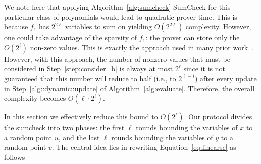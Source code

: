 					

We note here that applying Algorithm~\ref{alg:sumcheck} \textsf{SumCheck} for this particular class of polynomials would lead to quadratic prover time. This is because $f_1$ has $2^{2\ell}$ variables to sum on yielding $O(2^{2\ell})$ complexity. However, one could take advantage of the sparsity of $f_1$: the prover can store only the $O(2^\ell)$ non-zero values. This is exactly the approach used in many prior work~\cite{CMT,wahby2017full,vram}. However, with this approach, the number of nonzero values that must be considered in Step~\ref{step:consider_b} is always at most $2^{\ell}$ since it is not guaranteed that this number will reduce to half (i.e., to $2^{\ell-i}$) after every update in Step~\ref{alg::dynamic::update} of Algorithm~\ref{alg:evaluate}. Therefore, the overall complexity becomes $O(\ell \cdot 2^\ell)$. 

In this section we effectively reduce this bound to $O(2^\ell)$. Our protocol divides the sumcheck into two phases: the first $\ell$ rounds bounding the variables of $x$ to a random point $u$, and the last $\ell$ rounds bounding the variables of $y$ to a random point $v$. The central idea lies in rewriting Equation~\ref{eq:linearsc} as follows

